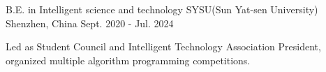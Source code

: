 

\begin{cventries}

  \cventry
    {B.E. in Intelligent science and technology} %
    {SYSU(Sun Yat-sen University)} %
    {Shenzhen, China} %
    {Sept. 2020 - Jul. 2024} %
    {
      \begin{cvitems} %
        \item {Led as Student Council and Intelligent Technology Association President, organized multiple algorithm programming competitions.}
      \end{cvitems}
    }

\end{cventries}
